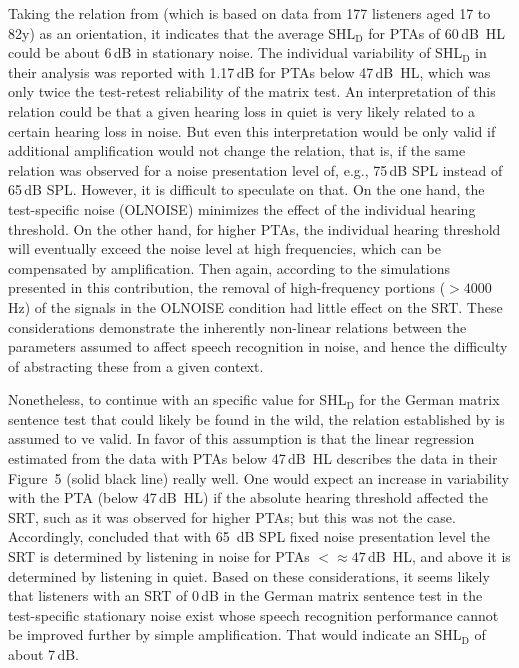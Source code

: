 \documentclass[10pt,a4paper,twocolumn]{article}
\begin{document}
Taking the relation from \cite{wardenga2015} (which is based on data from 177 listeners aged 17 to 82y) as an orientation, it indicates that the average SHL$_\text{D}$ for PTAs of 60\,dB~HL could be about 6\,dB in stationary noise.
%
The individual variability of SHL$_\text{D}$ in their analysis was reported with 1.17\,dB for PTAs below 47\,dB~HL, which was only twice the test-retest reliability of the matrix test.
%
An interpretation of this relation could be that a given hearing loss in quiet is very likely related to a certain hearing loss in noise.
%
But even this interpretation would be only valid if additional amplification would not change the relation, that is, if the same relation was observed for a noise presentation level of, e.g., 75\,dB SPL instead of 65\,dB SPL.
%
However, it is difficult to speculate on that.
%
On the one hand, the test-specific noise (OLNOISE) minimizes the effect of the individual hearing threshold.
%
On the other hand, for higher PTAs, the individual hearing threshold will eventually exceed the noise level at high frequencies, which can be compensated by amplification.
%
Then again, according to the simulations presented in this contribution, the removal of high-frequency portions ($>4000$\,Hz) of the signals in the OLNOISE condition had little effect on the SRT.
%
These considerations demonstrate the inherently non-linear relations between the parameters assumed to affect speech recognition in noise, and hence the difficulty of abstracting these from a given context.

Nonetheless, to continue with an specific value for SHL$_\text{D}$ for the German matrix sentence test that could likely be found in the wild, the relation established by \cite{wardenga2015} is assumed to ve valid.
%
In favor of this assumption is that the linear regression estimated from the data with PTAs below 47\,dB~HL describes the data in their Figure~5 (solid black line) really well.
%
One would expect an increase in variability with the PTA (below 47\,dB~HL) if the absolute hearing threshold affected the SRT, such as it was observed for higher PTAs; but this was not the case.
%
Accordingly, \cite{wardenga2015} concluded that with 65~dB SPL fixed noise presentation level the SRT is determined by listening in noise for PTAs $<\approx47$\,dB~HL, and above it is determined by listening in quiet.
%
Based on these considerations, it seems likely that listeners with an SRT of 0\,dB in the German matrix sentence test in the test-specific stationary noise exist whose speech recognition performance cannot be improved further by simple amplification.
%
That would indicate an SHL$_\text{D}$ of about 7\,dB.
\end{document}
